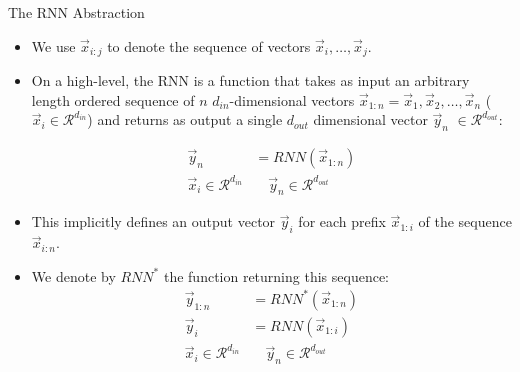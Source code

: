\documentclass[handout]{beamer}
\begin{document}
\begin{frame}{The RNN Abstraction}
\begin{scriptsize}
\begin{itemize}

\item We use $\vec{x}_{i:j}$ to denote the sequence of vectors $\vec{x}_i, \dots, \vec{x}_j$.

\item On a high-level, the RNN is a function that takes as input an arbitrary length ordered sequence of $n$ $d_{in}$-dimensional vectors $\vec{x}_{1 :n}=\vec{x}_1,\vec{x}_2, \dots, \vec{x}_n$ ( $\vec{x}_i \in  \mathcal{R}^{d_{in}}$) and returns as output a single $d_{out}$ dimensional vector $\vec{y}_n$ $\in \mathcal{R}^{d_{out}}$:

\begin{equation}
\begin{split}
\vec{y}_n & = RNN(\vec{x}_{1:n}) \\
\vec{x}_i \in  \mathcal{R}^{d_{in}} & \quad  \vec{y}_n  \in \mathcal{R}^{d_{out}}
\end{split}
\end{equation}

\item This implicitly defines an output vector $\vec{y}_i$ for each prefix $\vec{x}_{1:i}$ of the sequence $\vec{x}_{i:n}$.
\item We denote by $RNN^{*}$ the function returning this sequence:
\begin{equation}
\begin{split}
\vec{y}_{1:n} & = RNN^{*}(\vec{x}_{1:n}) \\
\vec{y}_i & = RNN(\vec{x}_{1:i}) \\
\vec{x}_i \in  \mathcal{R}^{d_{in}} & \quad  \vec{y}_n  \in \mathcal{R}^{d_{out}}
\end{split}
\end{equation}

\end{itemize}
\end{scriptsize}
\end{frame}
\end{document}
